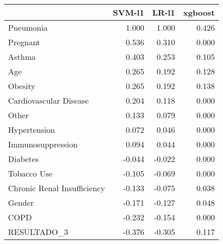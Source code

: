\begin{tabular}{lrrr}
\toprule
{} &  SVM-l1 &  LR-l1 &  xgboost \\
\midrule
Pneumonia                   &   1.000 &  1.000 &    0.426 \\
Pregnant                    &   0.536 &  0.310 &    0.000 \\
Asthma                      &   0.403 &  0.253 &    0.105 \\
Age                         &   0.265 &  0.192 &    0.128 \\
Obesity                     &   0.265 &  0.192 &    0.138 \\
Cardiovascular Disease      &   0.204 &  0.118 &    0.000 \\
Other                       &   0.133 &  0.079 &    0.000 \\
Hypertension                &   0.072 &  0.046 &    0.000 \\
Immunosuppression           &   0.094 &  0.044 &    0.000 \\
Diabetes                    &  -0.044 & -0.022 &    0.000 \\
Tobacco Use                 &  -0.105 & -0.069 &    0.000 \\
Chronic Renal Insufficiency &  -0.133 & -0.075 &    0.038 \\
Gender                      &  -0.171 & -0.127 &    0.048 \\
COPD                        &  -0.232 & -0.154 &    0.000 \\
RESULTADO\_3                 &  -0.376 & -0.305 &    0.117 \\
\bottomrule
\end{tabular}

